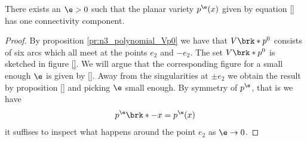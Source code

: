 \begin{proposition}
  There exists an $\e>0$ such that the planar variety $p^\e(x)$ given by equation \eqref{}
  has one connectivity component.
\end{proposition}
\begin{proof}
  By proposition \ref{pr:n3_polynomial_Vp0} we have that $V\brk*{p^0}$
  consists of six arcs which all meet at the points $e_2$ and $-e_2$.
  The set $V\brk*{p^0}$ is sketched in figure \ref{}.
  We will argue that the corresponding figure for a small enough $\e$ is given by \ref{}.
  Away from the singularities at $\pm e_2$ we obtain the result by proposition \ref{} and picking
  $\e$ small enough. By symmetry of $p^\e$, that is we have
  \begin{align}
    p^\e\brk*{-x}=p^\e(x)
  \end{align}
  it suffises to inspect what happens around the point $e_2$ as $\e\to0$.


\end{proof}
